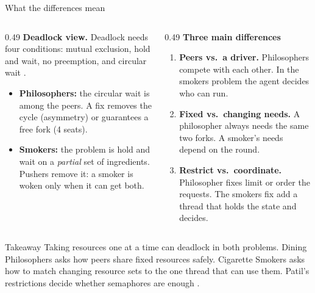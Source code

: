 \documentclass[aspectratio=169,10pt,xcolor=table]{beamer}
\begin{document}
\begin{frame}{What the differences mean}
    \begin{columns}[T]
        \begin{column}{0.49\textwidth}
            \small
            \textbf{Deadlock view.} Deadlock needs four conditions: mutual
            exclusion, hold and wait, no preemption, and circular wait
            \cite{coffman}.
            \vspace{3pt}
            \begin{itemize}
                \setlength\itemsep{3pt}
                \item \textcolor{dp}{\textbf{Philosophers:}} the circular wait is
                    among the peers. A fix removes the cycle (asymmetry) or
                    guarantees a free fork (4 seats).
                \item \textcolor{cs}{\textbf{Smokers:}} the problem is hold and
                    wait on a \emph{partial} set of ingredients. Pushers remove
                    it: a smoker is woken only when it can get both.
            \end{itemize}
        \end{column}
        \begin{column}{0.49\textwidth}
            \small
            \textbf{Three main differences}
            \begin{enumerate}
                \setlength\itemsep{3pt}
                \item \textbf{Peers vs.\ a driver.} Philosophers compete with
                    each other. In the smokers problem the agent decides who can
                    run.
                \item \textbf{Fixed vs.\ changing needs.} A philosopher always
                    needs the same two forks. A smoker's needs depend on the round.
                \item \textbf{Restrict vs.\ coordinate.} Philosopher fixes limit
                    or order the requests. The smokers fix add a thread that holds
                    the state and decides.
            \end{enumerate}
        \end{column}
    \end{columns}
    \vspace{4pt}
    \begin{block}{Takeaway}
        \small Taking resources one at a time can deadlock in both problems.
        Dining Philosophers asks how peers share fixed resources safely.
        Cigarette Smokers asks how to match changing resource sets to the one
        thread that can use them. Patil's restrictions decide whether
        semaphores are enough \cite{downey}.
    \end{block}
\end{frame}
\end{document}
